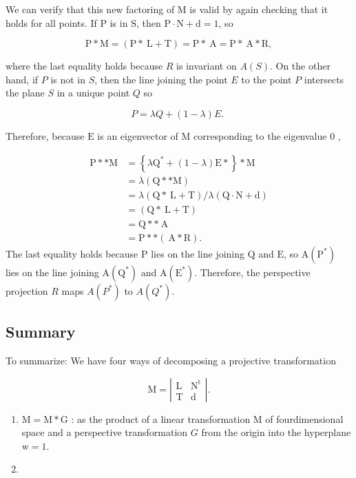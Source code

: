 We can verify that this new factoring of $\mathrm{M}$ is valid by again checking that it holds for all points. If $\mathrm{P}$ is in $\mathrm{S}$, then $\mathrm{P} \cdot \mathrm{N}+\mathrm{d}=1$, so

$$
\mathrm{P} * \mathrm{M}=(\mathrm{P} * \mathrm{~L}+\mathrm{T})=\mathrm{P} * \mathrm{~A}=\mathrm{P} * \mathrm{~A} * \mathrm{R},
$$

where the last equality holds because $R$ is invariant on $A(S)$. On the other hand, if $P$ is not in $S$, then the line joining the point $E$ to the point $P$ intersects the plane $S$ in a unique point $Q$ so

$$
P=\lambda Q+(1-\lambda) E \text {. }
$$

Therefore, because $\mathrm{E}$ is an eigenvector of $\mathrm{M}$ corresponding to the eigenvalue 0 ,

$$
\begin{aligned}
\mathrm{P} * * \mathrm{M} &=\left\{\lambda \mathrm{Q}^{*}+(1-\lambda) \mathrm{E} *\right\} * \mathrm{M} \\
&=\lambda(\mathrm{Q} * * \mathrm{M}) \\
&=\lambda(\mathrm{Q} * \mathrm{~L}+\mathrm{T}) / \lambda(\mathrm{Q} \cdot \mathrm{N}+\mathrm{d}) \\
&=(\mathrm{Q} * \mathrm{~L}+\mathrm{T}) \\
&=\mathrm{Q} * * \mathrm{~A} \\
&=\mathrm{P} * *(\mathrm{~A} * \mathrm{R}) .
\end{aligned}
$$
The last equality holds because $\mathrm{P}$ lies on the line joining $\mathrm{Q}$ and $\mathrm{E}$, so $\mathrm{A}\left(\mathrm{P}^{*}\right)$ lies on the line joining $\mathrm{A}\left(\mathrm{Q}^{*}\right)$ and $\mathrm{A}\left(\mathrm{E}^{*}\right)$. Therefore, the perspective projection $R$ maps $A\left(P^{*}\right)$ to $A\left(Q^{*}\right)$.

\subsection*{Summary}
To summarize: We have four ways of decomposing a projective transformation

$$
\mathrm{M}=\left|\begin{array}{cc}
\mathrm{L} & \mathrm{N}^{\mathrm{t}} \\
\mathrm{T} & \mathrm{d}
\end{array}\right| .
$$

\begin{enumerate}
  \item $\mathrm{M}=\mathrm{M} * \mathrm{G}$ : as the product of a linear transformation $\mathrm{M}$ of fourdimensional space and a perspective transformation $G$ from the origin into the hyperplane $\mathrm{w}=1$.

  \item 
\end{enumerate}

